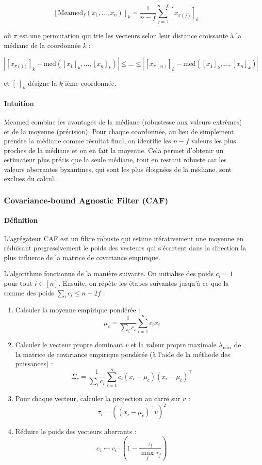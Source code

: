\documentclass[a4paper,11pt]{article}
\begin{document}
\[
\left[\mathrm{Meamed}_f(x_1,\ldots,x_n)\right]_k = \frac{1}{n-f} \sum_{j=1}^{n-f} \left[x_{\pi(j)}\right]_k
\]

où $\pi$ est une permutation qui trie les vecteurs selon leur distance croissante à la médiane de la coordonnée $k$ :

\[
\left|\left[x_{\pi(1)}\right]_k - \mathrm{med}\!\left(\left[x_1\right]_k,\ldots,\left[x_n\right]_k\right)\right| \leq \ldots \leq \left|\left[x_{\pi(n)}\right]_k - \mathrm{med}\!\left(\left[x_1\right]_k,\ldots,\left[x_n\right]_k\right)\right|
\]

et $\left[\cdot\right]_k$ désigne la $k$-ième coordonnée.

\paragraph{Intuition}

Meamed combine les avantages de la médiane (robustesse aux valeurs extrêmes) et de la moyenne (précision). Pour chaque coordonnée, au lieu de simplement prendre la médiane comme résultat final, on identifie les $n-f$ valeurs les plus proches de la médiane et on en fait la moyenne. Cela permet d'obtenir un estimateur plus précis que la seule médiane, tout en restant robuste car les valeurs aberrantes byzantines, qui sont les plus éloignées de la médiane, sont exclues du calcul.

\subsubsection{Covariance-bound Agnostic Filter (CAF)}

\paragraph{Définition}

L'agrégateur CAF est un filtre robuste qui estime itérativement une moyenne en réduisant progressivement le poids des vecteurs qui s'écartent dans la direction la plus influente de la matrice de covariance empirique.

L'algorithme fonctionne de la manière suivante. On initialise des poids $c_i = 1$ pour tout $i \in [n]$. Ensuite, on répète les étapes suivantes jusqu'à ce que la somme des poids $\sum_i c_i \leq n - 2f$ :

\begin{enumerate}
\item Calculer la moyenne empirique pondérée :
\[
\mu_c = \frac{1}{\sum_i c_i} \sum_{i=1}^n c_i x_i
\]
\item Calculer le vecteur propre dominant $v$ et la valeur propre maximale $\lambda_{\max}$ de la matrice de covariance empirique pondérée (à l'aide de la méthode des puissances) :
\[
\Sigma_c = \frac{1}{\sum_i c_i} \sum_{i=1}^n c_i (x_i - \mu_c)(x_i - \mu_c)^\top
\]
\item Pour chaque vecteur, calculer la projection au carré sur $v$ :
\[
\tau_i = \left((x_i - \mu_c)^\top v\right)^2
\]
\item Réduire le poids des vecteurs aberrants :
\[
c_i \leftarrow c_i \cdot \left(1 - \frac{\tau_i}{\max_j \tau_j}\right)
\]
\end{enumerate}
\end{document}
